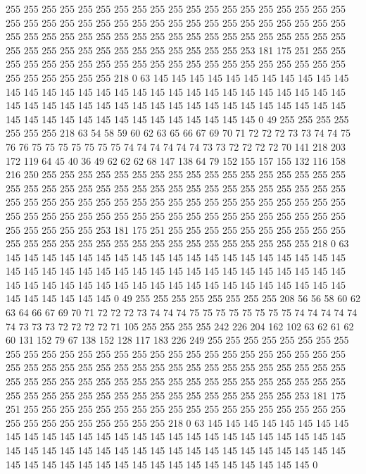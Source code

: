 255 255 255 255 255 255 255 255 255 255 255 255 255 255 255 255 255 255 255 255
255 255 255 255 255 255 255 255 255 255 255 255 255 255 255 255 255 255 255 255
255 255 255 255 255 255 255 255 255 255 255 255 255 255 255 255 255 255 255 255
255 255 255 255 255 255 255 255 255 255 253 181 175 251 255 255 255 255 255 255
255 255 255 255 255 255 255 255 255 255 255 255 255 255 255 255 255 255 255 255
255 218 0 63 145 145 145 145 145 145 145 145 145 145 145 145 145 145 145 145
145 145 145 145 145 145 145 145 145 145 145 145 145 145 145 145 145 145 145 145
145 145 145 145 145 145 145 145 145 145 145 145 145 145 145 145 145 145 145 145
145 145 145 145 145 145 145 0 49 255 255 255 255 255 255 255 218 63 54 58
59 60 62 63 65 66 67 69 70 71 72 72 72 73 73 74 74 75 76 76
75 75 75 75 75 75 75 74 74 74 74 74 74 73 73 72 72 72 72 70
141 218 203 172 119 64 45 40 36 49 62 62 62 68 147 138 64 79 152 155
157 155 132 116 158 216 250 255 255 255 255 255 255 255 255 255 255 255 255 255
255 255 255 255 255 255 255 255 255 255 255 255 255 255 255 255 255 255 255 255
255 255 255 255 255 255 255 255 255 255 255 255 255 255 255 255 255 255 255 255
255 255 255 255 255 255 255 255 255 255 255 255 255 255 255 255 255 255 255 255
255 255 255 255 255 255 253 181 175 251 255 255 255 255 255 255 255 255 255 255
255 255 255 255 255 255 255 255 255 255 255 255 255 255 255 255 255 218 0 63
145 145 145 145 145 145 145 145 145 145 145 145 145 145 145 145 145 145 145 145
145 145 145 145 145 145 145 145 145 145 145 145 145 145 145 145 145 145 145 145
145 145 145 145 145 145 145 145 145 145 145 145 145 145 145 145 145 145 145 145
145 145 145 0 49 255 255 255 255 255 255 255 255 208 56 56 58 60 62 63
64 66 67 69 70 71 72 72 72 73 74 74 74 75 75 75 75 75 75 75
75 74 74 74 74 74 74 73 73 73 72 72 72 72 71 105 255 255 255 255
242 226 204 162 102 63 62 61 62 60 131 152 79 67 138 152 128 117 183 226
249 255 255 255 255 255 255 255 255 255 255 255 255 255 255 255 255 255 255 255
255 255 255 255 255 255 255 255 255 255 255 255 255 255 255 255 255 255 255 255
255 255 255 255 255 255 255 255 255 255 255 255 255 255 255 255 255 255 255 255
255 255 255 255 255 255 255 255 255 255 255 255 255 255 255 255 255 255 255 255
255 255 253 181 175 251 255 255 255 255 255 255 255 255 255 255 255 255 255 255
255 255 255 255 255 255 255 255 255 255 255 255 255 218 0 63 145 145 145 145
145 145 145 145 145 145 145 145 145 145 145 145 145 145 145 145 145 145 145 145
145 145 145 145 145 145 145 145 145 145 145 145 145 145 145 145 145 145 145 145
145 145 145 145 145 145 145 145 145 145 145 145 145 145 145 145 145 145 145 0
